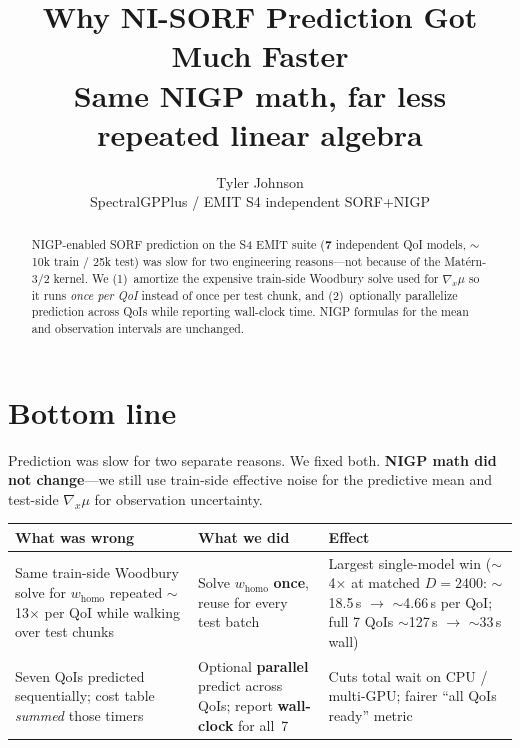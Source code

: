 \documentclass[11pt]{article}
\title{Why NI-SORF Prediction Got Much Faster\\[0.35em]
\large Same NIGP math, far less repeated linear algebra}
\author{Tyler Johnson\\
\small SpectralGPPlus / EMIT S4 independent SORF+NIGP}
\date{}
\newcommand{\gradmu}{\nabla_{x}\mu}
\newcommand{\homo}{w_{\mathrm{homo}}}
\begin{document}
\maketitle

\begin{abstract}
\noindent
NIGP-enabled SORF prediction on the S4 EMIT suite (\textbf{7} independent QoI models,
$\sim$10k train / 25k test) was slow for two engineering reasons---not because of the
Mat\'ern-3/2 kernel. We (1)~amortize the expensive train-side Woodbury solve used for
$\gradmu$ so it runs \emph{once per QoI} instead of once per test chunk, and
(2)~optionally parallelize prediction across QoIs while reporting wall-clock time.
NIGP formulas for the mean and observation intervals are unchanged.
\end{abstract}

\section{Bottom line}

Prediction was slow for two separate reasons. We fixed both.
\textbf{NIGP math did not change}---we still use train-side effective noise for the
predictive mean and test-side $\gradmu$ for observation uncertainty.

\begin{center}
\small
\begin{tabularx}{\textwidth}{@{}>{\raggedright\arraybackslash}p{}
  >{\raggedright\arraybackslash}p{}
  >{\raggedright\arraybackslash}X@{}}
\toprule
\textbf{What was wrong} & \textbf{What we did} & \textbf{Effect} \\
\midrule
Same train-side Woodbury solve for $\homo$ repeated $\sim$13$\times$ per QoI while
walking over test chunks
& Solve $\homo$ \textbf{once}, reuse for every test batch
& Largest single-model win ($\sim$4$\times$ at matched $D{=}2400$:
$\sim$18.5\,s $\to$ $\sim$4.66\,s per QoI; full 7 QoIs
$\sim$127\,s $\to$ $\sim$33\,s wall) \\[0.6em]
Seven QoIs predicted sequentially; cost table \emph{summed} those timers
& Optional \textbf{parallel} predict across QoIs; report \textbf{wall-clock} for all~7
& Cuts total wait on CPU / multi-GPU; fairer ``all QoIs ready'' metric \\
\bottomrule
\end{tabularx}
\end{center}

\vspace{0.5em}
\end{document}
